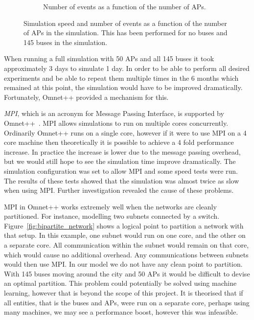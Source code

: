 \begin{figure}
\begin{subfigure}{0.45\textwidth}
                \caption{Number of events as a function of the number of APs.}
                \label{fig:access_points_events}
            \end{subfigure}
            \caption{Simulation speed and number of events as a function of the number of APs in the simulation. This has been performed for no buses and 145 buses in the simulation.}
            \label{fig:access_points_vs_time_and_events}
        \end{figure}

        When running a full simulation with 50 APs and all 145 buses it took approximately 3 days to simulate 1 day. In order to be able to perform all desired experiments and be able to repeat them multiple times in the 6 months which remained at this point, the simulation would have to be improved dramatically. Fortunately, Omnet++ provided a mechanism for this. 

        \emph{MPI}, which is an acronym for Message Passing Interface, is supported by Omnet++~\cite{omnetmpi}. MPI allows simulations to run on multiple cores concurrently. Ordinarily Omnet++ runs on a single core, however if it were to use MPI on a 4 core machine then theoretically it is possible to achieve a 4 fold performance increase. In practice the increase is lower due to the message passing overhead, but we would still hope to see the simulation time improve dramatically. The simulation configuration was set to allow MPI and some speed tests were run. The results of these tests showed that the simulation was almost twice as slow when using MPI. Further investigation revealed the cause of these problems. 

        

        MPI in Omnet++ works extremely well when the networks are cleanly partitioned. For instance, modelling two subnets connected by a switch. Figure~\ref{fig:bipartite_network} shows a logical point to partition a network with that setup. In this example, one subnet would run on one core, and the other on a separate core. All communication within the subnet would remain on that core, which would cause no additional overhead. Any communications between subnets would then use MPI. In our model we do not have any clean point to partition. With 145 buses moving around the city and 50 APs it would be difficult to devise an optimal partition. This problem could potentially be solved using machine learning, however that is beyond the scope of this project. It is theorised that if all entities, that is the buses and APs, were run on a separate core, perhaps using many machines, we may see a performance boost, however this was infeasible. 

